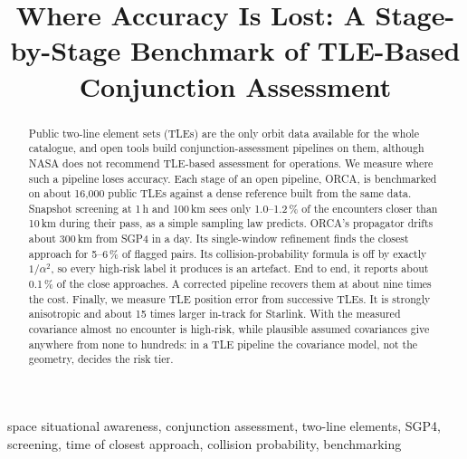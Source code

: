 \documentclass[conference]{IEEEtran}
\begin{document}
\title{Where Accuracy Is Lost: A Stage-by-Stage Benchmark of TLE-Based Conjunction Assessment}

\author{
}

\maketitle

\begin{abstract}
Public two-line element sets (TLEs) are the only orbit data available for the whole catalogue, and open tools build conjunction-assessment pipelines on them, although NASA does not recommend TLE-based assessment for operations. We measure where such a pipeline loses accuracy. Each stage of an open pipeline, ORCA, is benchmarked on about 16,000 public TLEs against a dense reference built from the same data. Snapshot screening at 1\,h and 100\,km sees only 1.0--1.2\,\% of the encounters closer than 10\,km during their pass, as a simple sampling law predicts. ORCA's propagator drifts about 300\,km from SGP4 in a day. Its single-window refinement finds the closest approach for 5--6\,\% of flagged pairs. Its collision-probability formula is off by exactly $1/\alpha^2$, so every high-risk label it produces is an artefact. End to end, it reports about 0.1\,\% of the close approaches. A corrected pipeline recovers them at about nine times the cost. Finally, we measure TLE position error from successive TLEs. It is strongly anisotropic and about 15 times larger in-track for Starlink. With the measured covariance almost no encounter is high-risk, while plausible assumed covariances give anywhere from none to hundreds: in a TLE pipeline the covariance model, not the geometry, decides the risk tier.
\end{abstract}

\begin{IEEEkeywords}
space situational awareness, conjunction assessment, two-line elements, SGP4, screening, time of closest approach, collision probability, benchmarking
\end{IEEEkeywords}

\end{document}
